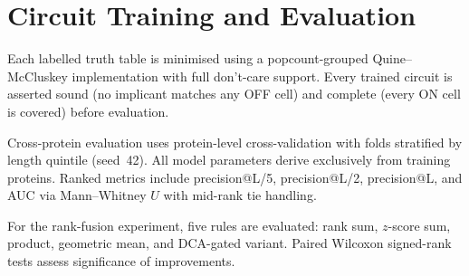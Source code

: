 \section{Circuit Training and Evaluation}
\label{sec:methods-circuit}

Each labelled truth table is minimised using a popcount-grouped
Quine--McCluskey implementation with full don't-care support.  Every trained
circuit is asserted sound (no implicant matches any OFF cell) and complete
(every ON cell is covered) before evaluation.

Cross-protein evaluation uses protein-level cross-validation with folds
stratified by length quintile (seed~42).  All model parameters derive
exclusively from training proteins.  Ranked metrics include precision@L/5,
precision@L/2, precision@L, and AUC via Mann--Whitney $U$ with mid-rank tie
handling.

For the rank-fusion experiment, five rules are evaluated: rank sum,
$z$-score sum, product, geometric mean, and DCA-gated variant.  Paired
Wilcoxon signed-rank tests assess significance of improvements.
